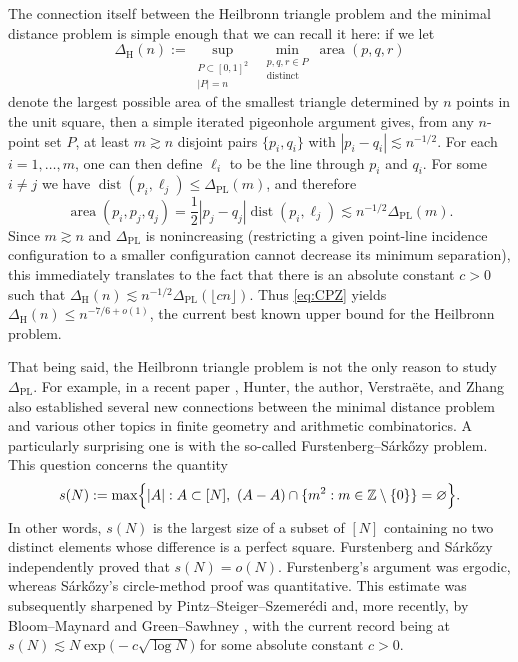 \documentclass[11pt,reqno]{amsart}
\theoremstyle{definition}
\theoremstyle{remark}
\newcommand{\Z}{\mathbb{Z}}
\newcommand{\dist}{\operatorname{dist}}
\newcommand{\PL}{\Delta_{\mathrm{PL}}}
\begin{document}
The connection itself between the Heilbronn triangle problem and the minimal distance problem is simple enough that we can recall it here: if we let
\[
        \Delta_{\mathrm H}(n)
        :=\sup_{\substack{P\subset[0,1]^2\\ |P|=n}}
          \ \min_{\substack{p,q,r\in P\\ \text{distinct}}}
          \operatorname{area}(p,q,r)
\]
denote the largest possible area of the smallest triangle determined by $n$ points in the unit square, then a simple iterated pigeonhole argument gives, from any $n$-point set $P$, at least $m\gtrsim n$ disjoint pairs $\{p_i,q_i\}$ with $|p_i-q_i|\lesssim n^{-1/2}$. For each $i=1,\ldots,m$, one can then define $\ell_i$ to be the line through $p_i$ and $q_i$. For some $i\ne j$ we have
$\dist(p_i,\ell_j)\le \PL(m)$, and therefore
\[
        \operatorname{area}(p_i,p_j,q_j)
        =\frac12|p_j-q_j|\dist(p_i,\ell_j)
        \lesssim n^{-1/2}\PL(m).
\]
Since $m\gtrsim n$ and $\PL$ is nonincreasing (restricting a given point-line incidence configuration to a smaller configuration cannot decrease its minimum separation), this immediately translates to the fact that there is an absolute constant $c>0$ such that $\Delta_{\mathrm H}(n) \lesssim n^{-1/2}\PL(\lfloor cn\rfloor)$. Thus \eqref{eq:CPZ} yields $\Delta_{\mathrm H}(n)\le n^{-7/6+o(1)}$, the current best known upper bound for the Heilbronn problem.

That being said, the Heilbronn triangle problem is not the only reason to study $\PL$. For example, in a recent paper \cite{HPVZ2026}, Hunter, the author, Verstra\"ete, and Zhang also established several new connections between the minimal distance problem and various other topics in finite geometry and arithmetic combinatorics. A particularly surprising one is with the so-called Furstenberg--S\'ark\H{o}zy problem. This question concerns the quantity
\begin{equation}
\label{eq:sN-definition}
        s(N)
        :=
        \max\Bigl\{|A|:A\subset[N],\ 
        (A-A)\cap\{m^2:m\in\Z\setminus\{0\}\}=\varnothing\Bigr\}.
\end{equation}
In other words, $s(N)$ is the largest size of a subset of $[N]$ containing no two distinct elements whose difference is a perfect square.  Furstenberg
\cite{Furstenberg1977} and S\'ark\H{o}zy \cite{Sarkozy1978}
independently proved that $s(N)=o(N)$.  Furstenberg's argument was ergodic, whereas S\'ark\H{o}zy's circle-method proof was quantitative. This estimate was subsequently sharpened by Pintz--Steiger--Szemer\'edi \cite{PintzSteigerSzemeredi1988} and, more recently, by Bloom--Maynard \cite{BloomMaynard2022} and Green--Sawhney \cite{GreenSawhney2024}, with the current record being at $s(N)\lesssim N\exp\!\bigl(-c\sqrt{\log N}\bigr)$ for some absolute constant $c>0$. 
\end{document}
